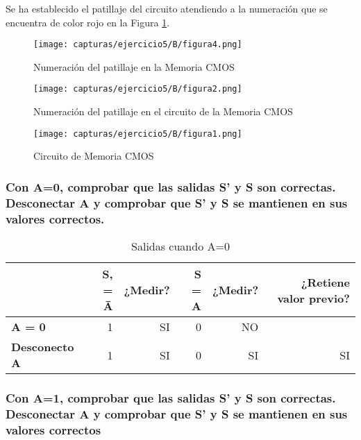 Se ha establecido el patillaje del circuito atendiendo a la numeración que se encuentra de color rojo en la Figura \ref{fig:practica5-a-12}.

\begin{figure}[H] %
	\centering
		\texttt{[image: capturas/ejercicio5/B/figura4.png]} 
	\caption{Numeración del patillaje en la Memoria CMOS}
	\label{fig:practica5-a-12}
\end{figure}

\begin{figure}[H] %
	\centering
	\texttt{[image: capturas/ejercicio5/B/figura2.png]} 
	\caption{Numeración del patillaje en el circuito de la Memoria CMOS}
	\label{fig:practica5-a-13}
\end{figure}

\begin{figure}[H] %
	\centering
	\texttt{[image: capturas/ejercicio5/B/figura1.png]} 
	\caption{Circuito de Memoria CMOS}
	\label{fig:practica5-a-14}
\end{figure}

\newpage

\subsubsection{Con A=0, comprobar que las salidas S’ y S son correctas. Desconectar A y comprobar que S’ y S se
	mantienen en sus valores correctos.}
 
\begin{table}[H]
	\centering
	\begin{tabular}{l|rr|rrr}
		& \textbf{S, = \={A} } & \textbf{¿Medir?} & \textbf{S = A} & \textbf{¿Medir?} & \textbf{¿Retiene valor previo?}\\
		\midrule
		\textbf{A = 0} & 1     & SI    & 0     & NO \\
		\textbf{Desconecto A} & 1     & SI    & 0     & SI & SI\\
	\end{tabular}%
	\caption{Salidas cuando A=0}
	\label{tab:ejercicio5b-1}%
\end{table}%



\subsubsection{Con A=1, comprobar que las salidas S’ y S son correctas. Desconectar A y comprobar que S’ y S se
	mantienen en sus valores correctos}

